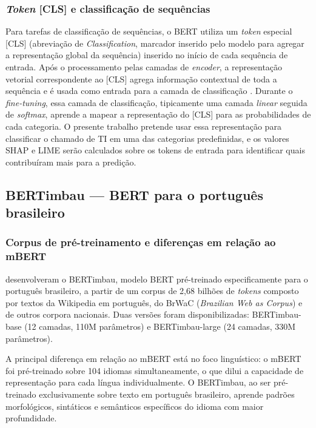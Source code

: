 \documentclass[
    12pt,                %
    openright,           %
    oneside,             %
    a4paper,             %
    english,             %
    brazil               %
]{abntex2}
\begin{document}
\subsubsection{\textit{Token} [CLS] e classificação de sequências}
\label{subsubsec:bert_cls}

Para tarefas de classificação de sequências, o BERT utiliza um \textit{token} especial [CLS] (abreviação de \textit{Classification}, marcador inserido pelo modelo para agregar a representação global da sequência) inserido no início de cada sequência de entrada. Após o processamento pelas camadas de \textit{encoder}, a representação vetorial correspondente ao [CLS] agrega informação contextual de toda a sequência e é usada como entrada para a camada de classificação \cite{devlin2019}. Durante o \textit{fine-tuning}, essa camada de classificação, tipicamente uma camada \textit{linear} seguida de \textit{softmax}, aprende a mapear a representação do [CLS] para as probabilidades de cada categoria. O presente trabalho pretende usar essa representação para classificar o chamado de TI em uma das categorias predefinidas, e os valores SHAP e LIME serão calculados sobre os tokens de entrada para identificar quais contribuíram mais para a predição.


\subsection{BERTimbau — BERT para o português brasileiro}
\label{subsec:bertimbau}

\subsubsection{Corpus de pré-treinamento e diferenças em relação ao mBERT}
\label{subsubsec:bertimbau_corpus}

 desenvolveram o BERTimbau, modelo BERT pré-treinado especificamente para o português brasileiro, a partir de um corpus de 2,68 bilhões de \textit{tokens} composto por textos da Wikipedia em português, do BrWaC (\textit{Brazilian Web as Corpus}) e de outros corpora nacionais. Duas versões foram disponibilizadas: BERTimbau-base (12 camadas, 110M parâmetros) e BERTimbau-large (24 camadas, 330M parâmetros).

A principal diferença em relação ao mBERT está no foco linguístico: o mBERT foi pré-treinado sobre 104 idiomas simultaneamente, o que dilui a capacidade de representação para cada língua individualmente. O BERTimbau, ao ser pré-treinado exclusivamente sobre texto em português brasileiro, aprende padrões morfológicos, sintáticos e semânticos específicos do idioma com maior profundidade.
\end{document}
